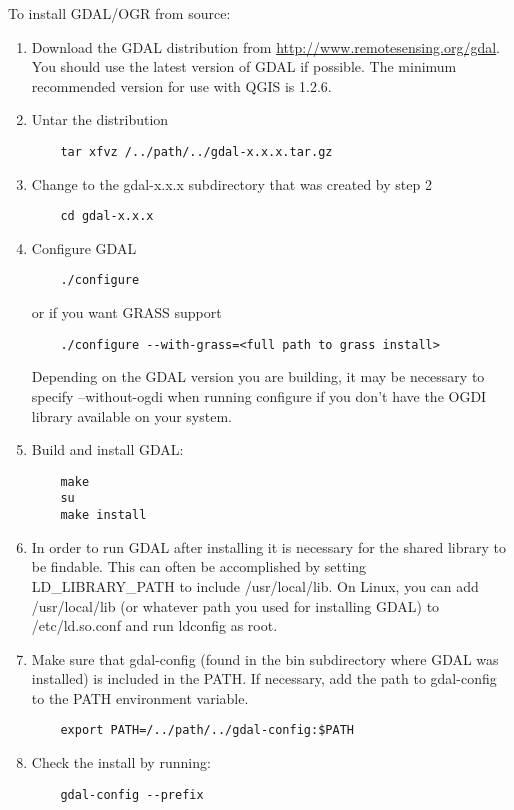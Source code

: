 To install GDAL/OGR from source:

  \begin{enumerate}
  \item Download the GDAL distribution from
  \url{http://www.remotesensing.org/gdal}. You should use the latest
  version of GDAL if possible. The minimum recommended version for use
  with QGIS is 1.2.6. 

  \item Untar the distribution 
  \begin{verbatim}
    tar xfvz /../path/../gdal-x.x.x.tar.gz
  \end{verbatim}

  \item Change to the gdal-x.x.x subdirectory that was created by step 2
  \begin{verbatim}
    cd gdal-x.x.x
  \end{verbatim}

  \item Configure GDAL
  \begin{verbatim}
    ./configure 
  \end{verbatim}
  or if you want GRASS support
  \begin{verbatim}
    ./configure --with-grass=<full path to grass install>
  \end{verbatim}
  Depending on the GDAL version you are building, it may be necessary to
  specify --without-ogdi when running configure if you don't have the OGDI
  library available on your system.

  \item Build and install GDAL:
  \begin{verbatim}
    make
    su
    make install
  \end{verbatim}

\item In order to run GDAL after installing it is necessary for the
shared library to be findable. This can often be accomplished by setting
LD\_LIBRARY\_PATH to include /usr/local/lib. On Linux, you can add
/usr/local/lib (or whatever path you used for installing GDAL) to
/etc/ld.so.conf and run ldconfig as root.

\item Make sure that gdal-config (found in the bin subdirectory where
GDAL was installed) is included in the PATH. If necessary, add the path to
gdal-config to the PATH environment variable.
  
  \begin{verbatim}
    export PATH=/../path/../gdal-config:$PATH
  \end{verbatim}

  \item Check the install by running:
  \begin{verbatim}
    gdal-config --prefix
  \end{verbatim}

  \end{enumerate}

